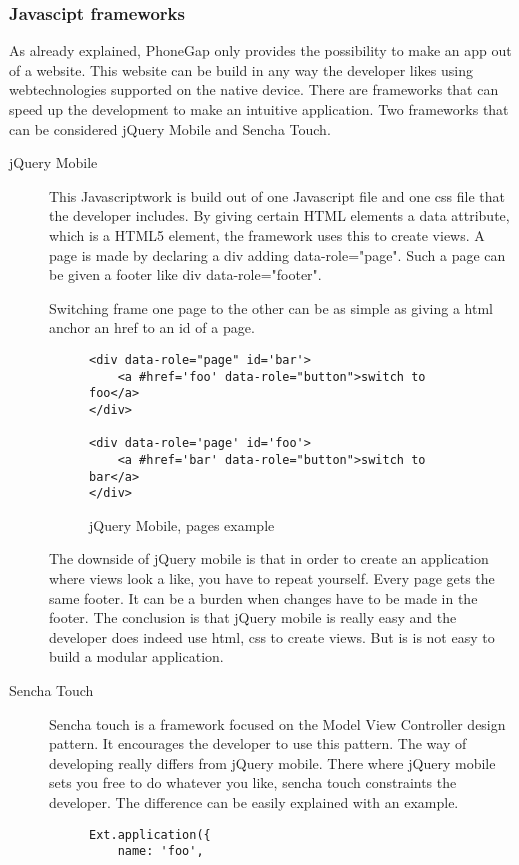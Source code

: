 \documentclass[10pt,a4paper]{article}
\begin{document}
\subsubsection*{Javascipt frameworks}
As already explained, PhoneGap only provides the possibility to make an app out of a website. This website can be build in any way the developer likes using webtechnologies supported on the native device. There are frameworks that can speed up the development to make an intuitive application. Two frameworks that can be considered jQuery Mobile and Sencha Touch. 
\begin{description}
\item [jQuery Mobile]
This Javascriptwork is build out of one Javascript file and one css file that the developer includes. By giving certain HTML elements a data attribute, which is a HTML5 element, the framework uses this to create views. A page is made by declaring a div adding data-role="page". Such a page can be given a footer like div data-role="footer". 

Switching frame one page to the other can be as simple as giving a html anchor an href to an id of a page. 
\begin{figure}
\begin{lstlisting}
<div data-role="page" id='bar'>
	<a #href='foo' data-role="button">switch to foo</a>
</div>

<div data-role='page' id='foo'>
	<a #href='bar' data-role="button">switch to bar</a>
</div>
\end{lstlisting}
\caption{jQuery Mobile, pages example}
\end{figure}

The downside of jQuery mobile is that in order to create an application where views look a like, you have to repeat yourself. Every page gets the same footer. It can be a burden when changes have to be made in the footer. The conclusion is that jQuery mobile is really easy and the developer does indeed use html, css to create views.  But is is not easy to build a modular application. 

\item [Sencha Touch]
Sencha touch is a framework focused on the Model View Controller design pattern. It encourages the developer to use this pattern. The way of developing really differs from jQuery mobile. There where jQuery mobile sets you free to do whatever you like, sencha touch constraints the developer. The difference can be easily explained with an example.

\begin{figure}[h!]
\begin{lstlisting}
Ext.application({
    name: 'foo',


\end{lstlisting}
\end{figure}
\end{description}
\end{document}
